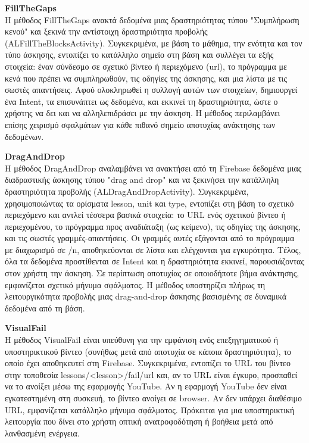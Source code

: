 \documentclass[11pt]{report}
\begin{document}
\vspace{0.3cm}
\textbf{FillTheGaps} \\

Η μέθοδος FillTheGaps ανακτά δεδομένα μιας δραστηριότητας τύπου "Συμπλήρωση κενού" και ξεκινά την αντίστοιχη δραστηριότητα προβολής (ALFillTheBlocksActivity). Συγκεκριμένα, με βάση το μάθημα, την ενότητα και τον τύπο άσκησης, εντοπίζει το κατάλληλο σημείο στη βάση και συλλέγει τα εξής στοιχεία: έναν σύνδεσμο σε σχετικό βίντεο ή περιεχόμενο (url), το πρόγραμμα με κενά που πρέπει να συμπληρωθούν, τις οδηγίες της άσκησης, και μια λίστα με τις σωστές απαντήσεις. Αφού ολοκληρωθεί η συλλογή αυτών των στοιχείων, δημιουργεί ένα Intent, τα επισυνάπτει ως δεδομένα, και εκκινεί τη δραστηριότητα, ώστε ο χρήστης να δει και να αλληλεπιδράσει με την άσκηση. Η μέθοδος περιλαμβάνει επίσης χειρισμό σφαλμάτων για κάθε πιθανό σημείο αποτυχίας ανάκτησης των δεδομένων. 

\vspace{0.3cm}
\textbf{DragAndDrop} \\

Η μέθοδος DragAndDrop αναλαμβάνει να ανακτήσει από τη Firebase δεδομένα μιας διαδραστικής άσκησης τύπου "drag and drop" και να ξεκινήσει την κατάλληλη δραστηριότητα προβολής (ALDragAndDropActivity). Συγκεκριμένα, χρησιμοποιώντας τα ορίσματα lesson, unit και type, εντοπίζει στη βάση το σχετικό περιεχόμενο και αντλεί τέσσερα βασικά στοιχεία: το URL ενός σχετικού βίντεο ή περιεχομένου, το πρόγραμμα προς αναδιάταξη (ως κείμενο), τις οδηγίες της άσκησης, και τις σωστές γραμμές-απαντήσεις. Οι γραμμές αυτές εξάγονται από το πρόγραμμα με διαχωρισμό σε /n, αποθηκεύονται σε λίστα και ελέγχονται για εγκυρότητα. Τέλος, όλα τα δεδομένα προστίθενται σε Intent και η δραστηριότητα εκκινεί, παρουσιάζοντας στον χρήστη την άσκηση. Σε περίπτωση αποτυχίας σε οποιοδήποτε βήμα ανάκτησης, εμφανίζεται σχετικό μήνυμα σφάλματος. Η μέθοδος υποστηρίζει πλήρως τη λειτουργικότητα προβολής μιας drag-and-drop άσκησης βασισμένης σε δυναμικά δεδομένα από τη βάση.  

\vspace{0.3cm}
\textbf{VisualFail} \\

Η μέθοδος VisualFail είναι υπεύθυνη για την εμφάνιση ενός επεξηγηματικού ή υποστηρικτικού βίντεο (συνήθως μετά από αποτυχία σε κάποια δραστηριότητα), το οποίο έχει αποθηκευτεί στη Firebase. Συγκεκριμένα, εντοπίζει το URL του βίντεο στην τοποθεσία lessons/<lesson>/fail/url και, αν το URL είναι έγκυρο, προσπαθεί να το ανοίξει μέσω της εφαρμογής YouTube. Αν η εφαρμογή YouTube δεν είναι εγκατεστημένη στη συσκευή, το βίντεο ανοίγει σε browser. Αν δεν υπάρχει διαθέσιμο URL, εμφανίζεται κατάλληλο μήνυμα σφάλματος. Πρόκειται για μια υποστηρικτική λειτουργία που δίνει στο χρήστη οπτική ανατροφοδότηση ή βοήθεια μετά από λανθασμένη ενέργεια.
\end{document}
